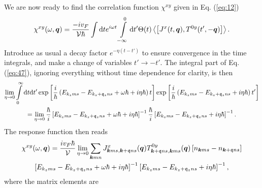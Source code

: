 We are now ready to find the correlation function $\chi ^{xy}$ given in Eq. (\ref{eq:12})
\begin{equation}
  \label{eq:47}
  \chi ^{xy}(\omega, \vec{q}) =
  \frac{-i v_F}{\mathcal{V} \hbar } 
  \int \mathrm{d}t e^{i \omega t} \int\limits_{-\infty }^0 \mathrm{d}t'
  \Theta (t)
  \Braket{\left[
J^x(t, \vec{q}), T^{0y}(t', -\vec{q})
    \right]}.
\end{equation}
Introduce as usual a decay factor $e^{-\eta (t-t')}$ to ensure convergence in the time integrals, and make a change of variables $t' \to -t'	$.
The integral part of Eq. (\ref{eq:47}), ignoring everything without time dependence for clarity, is then
\begin{multline}
  \lim_{\eta \to 0}
  \int\limits_{0}^{\infty } \mathrm{d}t \mathrm{d}t'
    \exp \left[ \frac{i}{\hbar } \left(
        E_{k_z m s} - E_{k_z+\mathfrak{q}_z ns} + \omega \hbar  + i \eta \hbar
      \right) t \right]
    \exp \left[ \frac{i}{\hbar } \left(
        E_{k_z m s} - E_{k_z+\mathfrak{q}_z ns} + i \eta \hbar
      \right) t' \right]\\
  =
  \lim_{\eta \to 0}\frac{\hbar}{i} \left[ E_{k_zms} - E_{k_z+\mathfrak{q}_z ns} + \omega \hbar  + i\eta \hbar  \right]^{-1}
\frac{\hbar}{i} \left[ E_{k_zms} - E_{k_z+\mathfrak{q}_z ns} + i \eta \hbar  \right]^{-1}.
\end{multline}
The response function then reads
\begin{multline}
  \chi ^{xy}(\omega , \bm{q}) =
  \frac{i v_F \hbar }{\mathcal{V} }
  \lim_{\eta \to 0}
  \sum\limits_{\bm{k}mn}^{}
  J^x_{\bm{k}ms, \bm{k}+\mathfrak{q}ns}(\bm{q})
  T^{0y}_{\bm{k}+\mathfrak{q}ns, \bm{k}ms}(\bm{q})
  \left[ n_{\bm{k}ms}- n_{\bm{k}+\mathfrak{q} ns} \right] \\
  \left[ E_{k_zms} - E_{k_z+\mathfrak{q}_z ns} + \omega \hbar  + i\eta \hbar  \right]^{-1}
  \left[ E_{k_zms} - E_{k_z+\mathfrak{q}_z ns} + i \eta \hbar  \right]^{-1},
\end{multline}
where the matrix elements are
